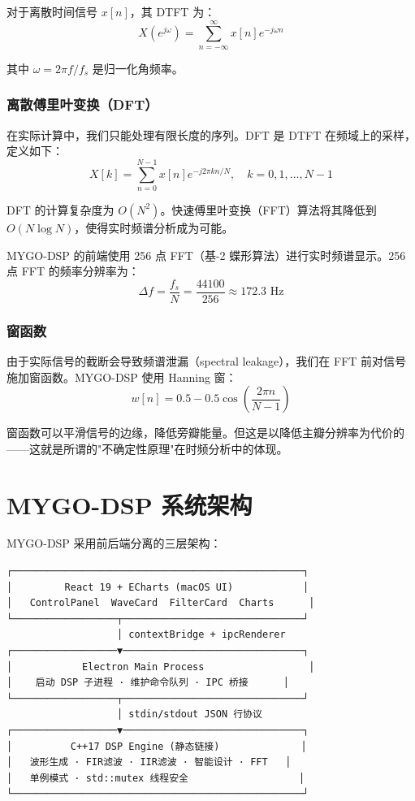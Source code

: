 ﻿\documentclass[12pt,a4paper,oneside]{ctexbook}
\begin{document}
对于离散时间信号 \(x[n]\)，其 DTFT 为：
\[
X(e^{j\omega}) = \sum_{n=-\infty}^{\infty} x[n] e^{-j\omega n}
\]

其中 \(\omega = 2\pi f / f_s\) 是归一化角频率。

\subsubsection{离散傅里叶变换（DFT）}

在实际计算中，我们只能处理有限长度的序列。DFT 是 DTFT 在频域上的采样，定义如下：
\[
X[k] = \sum_{n=0}^{N-1} x[n] e^{-j 2\pi k n / N}, \quad k = 0, 1, \ldots, N-1
\]

DFT 的计算复杂度为 \(O(N^2)\)。快速傅里叶变换（FFT）算法将其降低到 \(O(N \log N)\)，使得实时频谱分析成为可能。

MYGO-DSP 的前端使用 256 点 FFT（基-2 蝶形算法）进行实时频谱显示。256 点 FFT 的频率分辨率为：
\[
\Delta f = \frac{f_s}{N} = \frac{44100}{256} \approx 172.3 \text{ Hz}
\]

\subsubsection{窗函数}

由于实际信号的截断会导致频谱泄漏（spectral leakage），我们在 FFT 前对信号施加窗函数。MYGO-DSP 使用 Hanning 窗：
\[
w[n] = 0.5 - 0.5 \cos\left(\frac{2\pi n}{N-1}\right)
\]

窗函数可以平滑信号的边缘，降低旁瓣能量。但这是以降低主瓣分辨率为代价的——这就是所谓的"不确定性原理"在时频分析中的体现。

\section{MYGO-DSP 系统架构}

MYGO-DSP 采用前后端分离的三层架构：

\begin{verbatim}
┌──────────────────────────────────────────────────┐
│         React 19 + ECharts (macOS UI)            │
│   ControlPanel  WaveCard  FilterCard  Charts      │
└──────────────────┬───────────────────────────────┘
                   │ contextBridge + ipcRenderer
┌──────────────────▼───────────────────────────────┐
│            Electron Main Process                  │
│    启动 DSP 子进程 · 维护命令队列 · IPC 桥接      │
└──────────────────┬───────────────────────────────┘
                   │ stdin/stdout JSON 行协议
┌──────────────────▼───────────────────────────────┐
│          C++17 DSP Engine (静态链接)              │
│   波形生成 · FIR滤波 · IIR滤波 · 智能设计 · FFT   │
│   单例模式 · std::mutex 线程安全                   │
└──────────────────────────────────────────────────┘
\end{verbatim}
\end{document}
